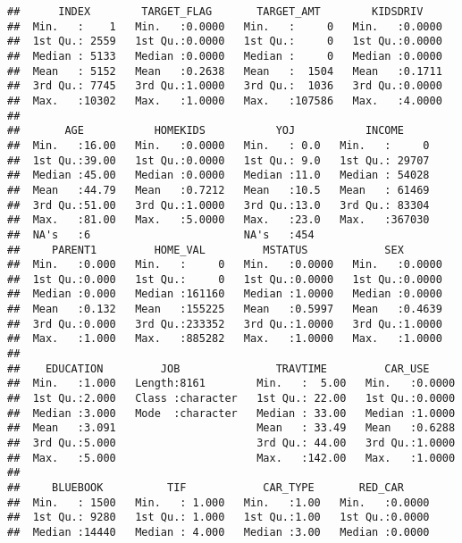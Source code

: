 \documentclass[
]{article}
\begin{document}
\begin{verbatim}
##      INDEX        TARGET_FLAG       TARGET_AMT        KIDSDRIV     
##  Min.   :    1   Min.   :0.0000   Min.   :     0   Min.   :0.0000  
##  1st Qu.: 2559   1st Qu.:0.0000   1st Qu.:     0   1st Qu.:0.0000  
##  Median : 5133   Median :0.0000   Median :     0   Median :0.0000  
##  Mean   : 5152   Mean   :0.2638   Mean   :  1504   Mean   :0.1711  
##  3rd Qu.: 7745   3rd Qu.:1.0000   3rd Qu.:  1036   3rd Qu.:0.0000  
##  Max.   :10302   Max.   :1.0000   Max.   :107586   Max.   :4.0000  
##                                                                    
##       AGE           HOMEKIDS           YOJ           INCOME      
##  Min.   :16.00   Min.   :0.0000   Min.   : 0.0   Min.   :     0  
##  1st Qu.:39.00   1st Qu.:0.0000   1st Qu.: 9.0   1st Qu.: 29707  
##  Median :45.00   Median :0.0000   Median :11.0   Median : 54028  
##  Mean   :44.79   Mean   :0.7212   Mean   :10.5   Mean   : 61469  
##  3rd Qu.:51.00   3rd Qu.:1.0000   3rd Qu.:13.0   3rd Qu.: 83304  
##  Max.   :81.00   Max.   :5.0000   Max.   :23.0   Max.   :367030  
##  NA's   :6                        NA's   :454                    
##     PARENT1         HOME_VAL         MSTATUS            SEX        
##  Min.   :0.000   Min.   :     0   Min.   :0.0000   Min.   :0.0000  
##  1st Qu.:0.000   1st Qu.:     0   1st Qu.:0.0000   1st Qu.:0.0000  
##  Median :0.000   Median :161160   Median :1.0000   Median :0.0000  
##  Mean   :0.132   Mean   :155225   Mean   :0.5997   Mean   :0.4639  
##  3rd Qu.:0.000   3rd Qu.:233352   3rd Qu.:1.0000   3rd Qu.:1.0000  
##  Max.   :1.000   Max.   :885282   Max.   :1.0000   Max.   :1.0000  
##                                                                    
##    EDUCATION         JOB               TRAVTIME         CAR_USE      
##  Min.   :1.000   Length:8161        Min.   :  5.00   Min.   :0.0000  
##  1st Qu.:2.000   Class :character   1st Qu.: 22.00   1st Qu.:0.0000  
##  Median :3.000   Mode  :character   Median : 33.00   Median :1.0000  
##  Mean   :3.091                      Mean   : 33.49   Mean   :0.6288  
##  3rd Qu.:5.000                      3rd Qu.: 44.00   3rd Qu.:1.0000  
##  Max.   :5.000                      Max.   :142.00   Max.   :1.0000  
##                                                                      
##     BLUEBOOK          TIF            CAR_TYPE       RED_CAR      
##  Min.   : 1500   Min.   : 1.000   Min.   :1.00   Min.   :0.0000  
##  1st Qu.: 9280   1st Qu.: 1.000   1st Qu.:1.00   1st Qu.:0.0000  
##  Median :14440   Median : 4.000   Median :3.00   Median :0.0000  

\end{verbatim}
\end{document}
